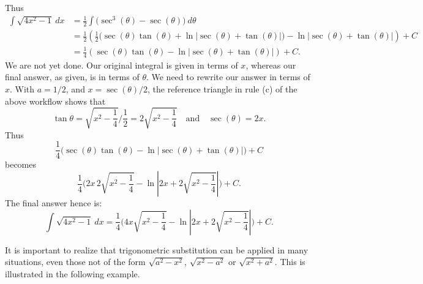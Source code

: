 \begin{example}
Thus
\begin{align*}
\int \sqrt{4x^2-1}\ dx &=\frac12\int \big(\sec^3(\theta) - \sec(\theta)\big)\ d\theta\\[0.2cm]
			&= \frac12\left(\frac12\Big(\sec(\theta)\tan(\theta) + \ln\left|\sec(\theta)+\tan(\theta)\right|\Big) -\ln\left|\sec(\theta) + \tan(\theta)\right|\right) + C\\[0.2cm]
			&= \frac14\left(\sec(\theta)\tan(\theta) -\ln\left|\sec(\theta)+\tan(\theta)\right|\right)+C.
\end{align*}
We are not yet done. Our original integral is given in terms of $x$, whereas our final answer, as given, is in terms of $\theta$. We need to rewrite our answer in terms of $x$. With $a=1/2$, and $x=\sec(\theta)/2$, the reference triangle in rule (c) of the above workflow shows that 
$$\tan \theta = \sqrt{x^2-\frac14}\Big/\frac12 = 2\sqrt{x^2-\frac14}\quad \text{and}\quad \sec(\theta) = 2x.$$
Thus
$$
\frac14\Big(\sec(\theta)\tan(\theta) -\ln\big|\sec(\theta)+\tan(\theta)\big|\Big)+C
$$ 
becomes
$$
				\frac14\Big(2x\, 2\sqrt{x^2-\frac14} - \ln\left|2x + 2\sqrt{x^2-\frac14}\right|\Big)+C.
$$
The final answer hence is:
$$
\int \sqrt{4x^2-1}\ dx = \frac14\Big(4x\sqrt{x^2-\frac14} - \ln\left|2x + 2\sqrt{x^2-\frac14}\right|\Big)+C.
$$
\end{example}

It is important to realize that trigonometric substitution can be applied in many situations, even those not of the form $\sqrt{a^2-x^2}$, $\sqrt{x^2-a^2}$ or $\sqrt{x^2+a^2}$. This is illustrated in the following example. 

